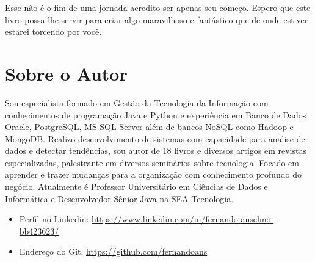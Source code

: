 \documentclass[a4paper,11pt]{book} %
\begin{document}
Esse não é o fim de uma jornada acredito ser apenas seu começo. Espero que este livro possa lhe servir para criar algo maravilhoso e fantástico que de onde estiver estarei torcendo por você.

\section{Sobre o Autor}
Sou especialista formado em Gestão da Tecnologia da Informação com conhecimentos de programação Java e Python e experiência em Banco de Dados Oracle, PostgreSQL, MS SQL Server além de bancos NoSQL como Hadoop e MongoDB. Realizo desenvolvimento de sistemas com capacidade para analise de dados e detectar tendências, sou autor de 18 livros e diversos artigos em revistas especializadas, palestrante em diversos seminários sobre tecnologia. Focado em aprender e trazer mudanças para a organização com conhecimento profundo do negócio. Atualmente é Professor Universitário em Ciências de Dados e Informática  e Desenvolvedor Sênior Java  na SEA Tecnologia.
\begin{itemize}
 \item Perfil no Linkedin: \url{https://www.linkedin.com/in/fernando-anselmo-bb423623/}
 \item Endereço do Git: \url{https://github.com/fernandoans} 
\end{itemize}

\clearpage
\begingroup
\thispagestyle{empty}
\vfill
\endgroup


\end{document}
